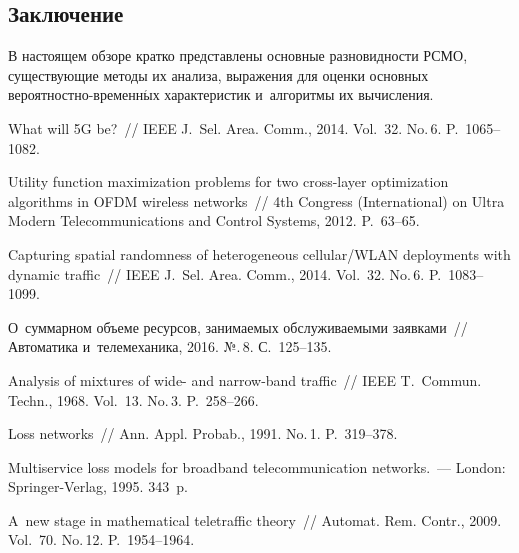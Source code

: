 \begin{multicols}{2}
\section{Заключение}

В настоящем обзоре кратко представлены основные разновидности 
РСМО, существующие методы их анализа, выражения для оценки 
основных ве\-ро\-ят\-но\-ст\-но-вре\-мен\-н$\acute{\mbox{ы}}$х 
характеристик и~алгоритмы их вычисления.

{\small\frenchspacing
 {%
 \begin{thebibliography}{99}
 What will 5G be?~// {IEEE J.~Sel. Area.  
Comm.}, 2014. Vol.~32. No.\,6. P.~1065--1082.



Utility function maximization problems for two cross-layer optimization 
algorithms in OFDM wireless networks~// {4th Congress (International) on Ultra 
Modern Telecommunications and Control Systems}, 2012.  P.~63--65.

 Capturing spatial randomness of heterogeneous 
cellular/WLAN deployments with dynamic traffic~// {IEEE J.~Sel. 
Area. Comm.}, 2014. Vol.~32. No.\,6. P.~1083--1099.

 О~суммарном объеме 
ресурсов, занимаемых обслуживаемыми заявками~// {Автоматика и~телемеханика}, 
2016. №.\,8. С.~125--135.

Analysis of mixtures of wide- and narrow-band traffic~// {IEEE T.~Commun.
 Techn.}, 1968. Vol.~13. No.\,3. P.~258--266.

Loss networks~// {Ann. Appl. Probab.}, 1991. No.\,1. P.~319--378.

Multiservice loss models for broadband telecommunication networks.~--- {London: 
Springer-Verlag}, 1995. 343~p.

A~new stage in mathematical teletraffic theory~// {Automat. Rem. 
Contr.}, 2009. Vol.~70. No.\,12. P.~1954--1964.


\end{thebibliography}}}
\end{multicols}
